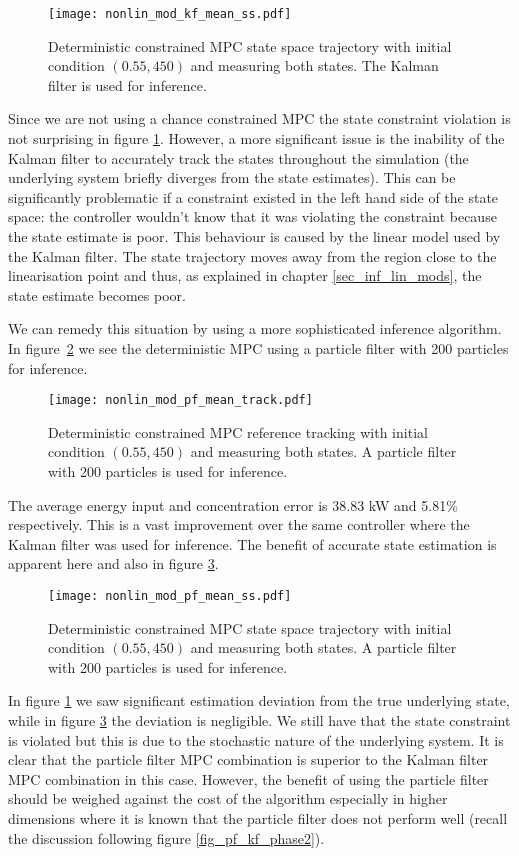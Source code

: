 \begin{figure}[H] 
\centering
\texttt{[image: nonlin\_mod\_kf\_mean\_ss.pdf]}
\caption{Deterministic constrained MPC state space trajectory with initial condition $(0.55, 450)$ and measuring both states. The Kalman filter is used for inference.}
\label{fig_nonlin_mod_kf_mean_ss}
\end{figure}
Since we are not using a chance constrained MPC the state constraint violation is not surprising in figure \ref{fig_nonlin_mod_kf_mean_ss}. However, a more significant issue is the inability of the Kalman filter to accurately track the states throughout the simulation (the underlying system briefly diverges from the state estimates). This can be significantly problematic if a constraint existed in the left hand side of the state space: the controller wouldn't know that it was violating the constraint because the state estimate is poor. This behaviour is caused by the linear model used by the Kalman filter. The state trajectory moves away from the region close to the linearisation point and thus, as explained in chapter \ref{sec_inf_lin_mods}, the state estimate becomes poor.

We can remedy this situation by using a more sophisticated inference algorithm. In figure~\ref{fig_nonlin_mod_pf_mean_track} we see the deterministic MPC using a particle filter with 200 particles for inference. 
\begin{figure}[H] 
\centering
\texttt{[image: nonlin\_mod\_pf\_mean\_track.pdf]}
\caption{Deterministic constrained MPC reference tracking with initial condition $(0.55, 450)$ and measuring both states. A particle filter with 200 particles is used for inference.}
\label{fig_nonlin_mod_pf_mean_track}
\end{figure} 
The average energy input and concentration error is 38.83 kW and 5.81\% respectively. This is a vast improvement over the same controller where the Kalman filter was used for inference. The benefit of accurate state estimation is apparent here and also in figure \ref{fig_nonlin_mod_pf_mean_ss}.
\begin{figure}[H] 
\centering
\texttt{[image: nonlin\_mod\_pf\_mean\_ss.pdf]}
\caption{Deterministic constrained MPC state space trajectory with initial condition $(0.55, 450)$ and measuring both states. A particle filter with 200 particles is used for inference.}
\label{fig_nonlin_mod_pf_mean_ss}
\end{figure}
In figure \ref{fig_nonlin_mod_kf_mean_ss} we saw significant estimation deviation from the true underlying state, while in figure \ref{fig_nonlin_mod_pf_mean_ss} the deviation is negligible. We still have that the state constraint is violated but this is due to the stochastic nature of the underlying system. It is clear that the particle filter MPC combination is superior to the Kalman filter MPC combination in this case. However, the benefit of using the particle filter should be weighed against the cost of the algorithm especially in higher dimensions where it is known that the particle filter does not perform well (recall the discussion following figure \ref{fig_pf_kf_phase2}).


